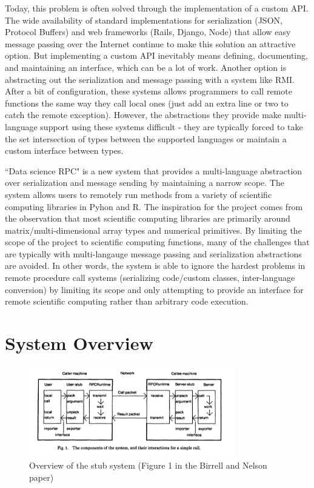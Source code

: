 \documentclass[11pt]{article}
\begin{document}
Today, this problem is often solved through the implementation of a custom API. The wide availability of standard implementations for serialization (JSON, Protocol Buffers) and web frameworks (Rails, Django, Node) that allow easy message passing over the Internet continue to make this solution an attractive option. But implementing a custom API inevitably means defining, documenting, and maintaining an interface, which can be a lot of work. Another option is abstracting out the serialization and message passing with a system like RMI. After a bit of configuration, these systems allows programmers to call remote functions the same way they call local ones (just add an extra line or two to catch the remote exception). However, the abstractions they provide make multi-language support using these systems difficult - they are typically forced to take the set intersection of types between the supported languages or maintain a custom interface between types. 

``Data science RPC" is a new system that provides a multi-language abstraction over serialization and message sending by maintaining a narrow scope. The system allows users to remotely run methods from a variety of scientific computing libraries in Pyhon and R. The inspiration for the project comes from the observation that most scientific computing libraries are primarily around matrix/multi-dimensional array types and numerical primitives. By limiting the scope of the project to scientific computing functions, many of the challenges that are typically with multi-langauge message passing and serialization abstractions are avoided. In other words, the system is able to ignore the hardest problems in remote procedure call systems (serializing code/custom classes, inter-language conversion) by limiting its scope and only attempting to provide an interface for remote scientific computing rather than arbitrary code execution. 

\section{System Overview}


\begin{figure}[!ht]
  \centering
      \includegraphics[width=0.8\textwidth]{stubs}
  \caption{Overview of the stub system (Figure 1 in the Birrell and Nelson paper)}
\end{figure}
\end{document}
